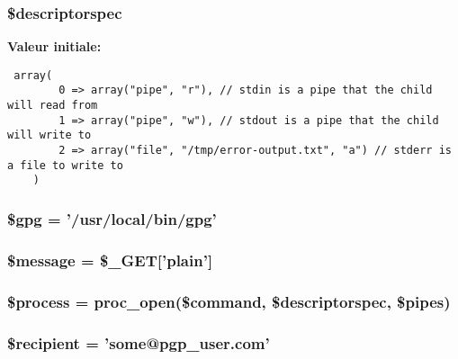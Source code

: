 \hypertarget{gpg_8php_a5}{
\subsubsection[\$descriptorspec]{\setlength{\rightskip}{0pt plus 5cm}\$descriptorspec}}
\label{gpg_8php_a5}


{\bf Valeur initiale:}

\footnotesize\begin{verbatim} array(
        0 => array("pipe", "r"), // stdin is a pipe that the child will read from
        1 => array("pipe", "w"), // stdout is a pipe that the child will write to
        2 => array("file", "/tmp/error-output.txt", "a") // stderr is a file to write to
    )
\end{verbatim}\normalsize 
\hypertarget{gpg_8php_a0}{
\subsubsection[\$gpg]{\setlength{\rightskip}{0pt plus 5cm}\$gpg = '/usr/local/bin/gpg'}}
\label{gpg_8php_a0}


\hypertarget{gpg_8php_a4}{
\subsubsection[\$message]{\setlength{\rightskip}{0pt plus 5cm}\$message = \$\_\-GET\mbox{[}'plain'\mbox{]}}}
\label{gpg_8php_a4}


\hypertarget{gpg_8php_a6}{
\subsubsection[\$process]{\setlength{\rightskip}{0pt plus 5cm}\$process = proc\_\-open(\$command, \$descriptorspec, \$pipes)}}
\label{gpg_8php_a6}


\hypertarget{gpg_8php_a2}{
\subsubsection[\$recipient]{\setlength{\rightskip}{0pt plus 5cm}\$recipient = 'some@pgp\_\-user.com'}}
\label{gpg_8php_a2}


